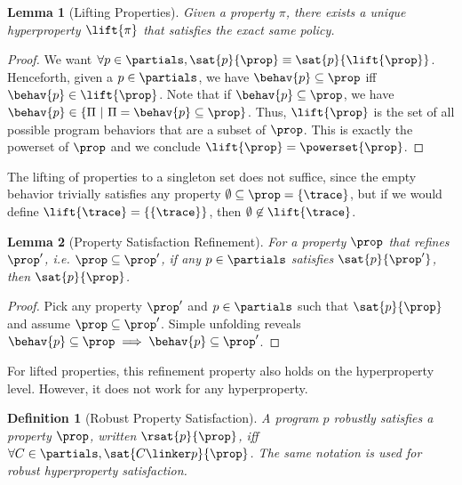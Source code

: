 \documentclass[a4paper,names,dvipsnames]{article}
\newtheorem{definition}{Definition}
\newtheorem{lemma}{Lemma}
\begin{document}
\begin{lemma}[Lifting Properties]
  Given a property $\pi$, there exists a unique hyperproperty $\lift{\pi}$ that satisfies the exact same policy.
\end{lemma}
\begin{proof}
  We want $\forall p \in\partials, \sat{p}{\prop}\equiv\sat{p}{\lift{\prop}}$.
  Henceforth, given a $p\in\partials$, we have $\behav{p}\subseteq\prop$ iff $\behav{p}\in\lift{\prop}$.
  Note that if $\behav{p}\subseteq\prop$, we have $\behav{p}\in\left\{\Pi\ |\ \Pi=\behav{p}\subseteq\prop\right\}$.
  Thus, $\lift{\prop}$ is the set of all possible program behaviors that are a subset of $\prop$.
  This is exactly the powerset of $\prop$ and we conclude $\lift{\prop}=\powerset{\prop}$.
\end{proof}
\noindent
The lifting of properties to a singleton set does not suffice, since the empty behavior trivially satisfies any property $\emptyset\subseteq\prop=\{\trace\}$, but if we would define $\lift{\trace}=\{\{\trace\}\}$, then $\emptyset\not\in\lift{\trace}$.

\begin{lemma}[Property Satisfaction Refinement]
  For a property $\prop$ that refines $\prop'$, i.e. $\prop\subseteq\prop'$, if any $p\in\partials$ satisfies $\sat{p}{\prop'}$, then $\sat{p}{\prop}$.
\end{lemma}
\begin{proof}
  Pick any property $\prop'$ and $p\in\partials$ such that $\sat{p}{\prop}$ and assume $\prop\subseteq\prop'$.
  Simple unfolding reveals $\behav{p}\subseteq\prop\implies\behav{p}\subseteq\prop'$.
\end{proof}
\noindent
For lifted properties, this refinement property also holds on the hyperproperty level.
However, it does not work for any hyperproperty. %

\begin{definition}[Robust Property Satisfaction]
  A program $p$ robustly satisfies a property $\prop$, written $\rsat{p}{\prop}$, iff $\forall C\in\partials,\sat{C\linker p}{\prop}$. The same notation is used for robust hyperproperty satisfaction.
\end{definition}
\end{document}
